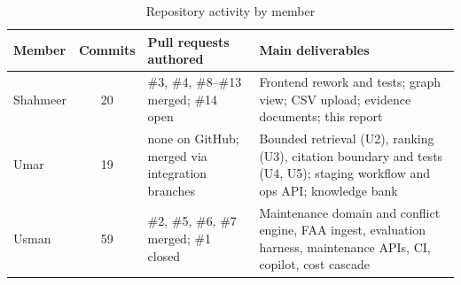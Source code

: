 \begin{table}[H]
\centering
\caption{Repository activity by member}
\label{tab:activity}
\small
\begin{tabularx}{\textwidth}{@{}>{\raggedright\arraybackslash}p{} c >{\raggedright\arraybackslash}p{} L@{}}
\toprule
Member & Commits & Pull requests authored & Main deliverables \\
\midrule
Shahmeer & 20 & \#3, \#4, \#8--\#13 merged; \#14 open & Frontend rework and tests; graph view; CSV upload; evidence documents; this report \\
Umar & 19 & none on GitHub; merged via integration branches & Bounded retrieval (U2), ranking (U3), citation boundary and tests (U4, U5); staging workflow and ops API; knowledge bank \\
Usman & 59 & \#2, \#5, \#6, \#7 merged; \#1 closed & Maintenance domain and conflict engine, FAA ingest, evaluation harness, maintenance APIs, CI, copilot, cost cascade \\
\bottomrule
\end{tabularx}
\end{table}
